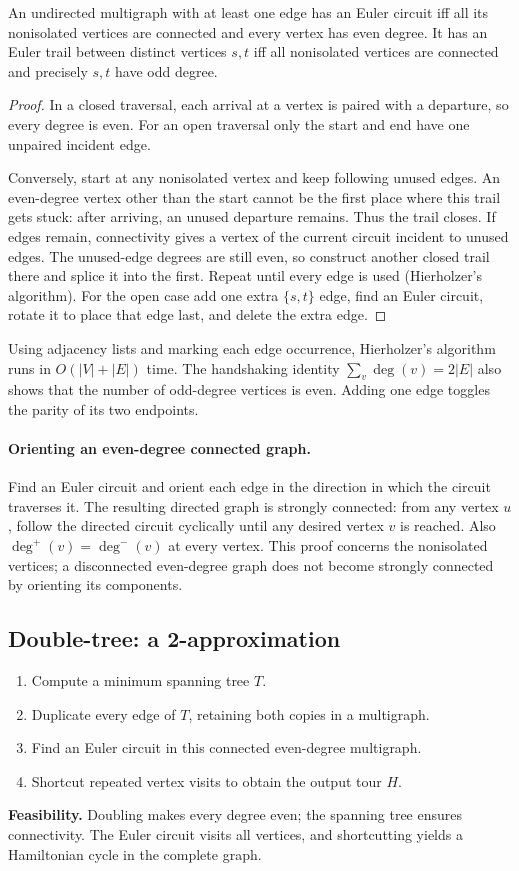 \begin{theorem}
An undirected multigraph with at least one edge has an Euler circuit iff
all its nonisolated vertices are connected and every vertex has even degree.
It has an Euler trail between distinct vertices $s,t$ iff all nonisolated
vertices are connected and precisely $s,t$ have odd degree.
\end{theorem}
\begin{proof}
In a closed traversal, each arrival at a vertex is paired with a departure,
so every degree is even.  For an open traversal only the start and end have
one unpaired incident edge.

Conversely, start at any nonisolated vertex and keep following unused edges.
An even-degree vertex other than the start cannot be the first place where
this trail gets stuck: after arriving, an unused departure remains.  Thus
the trail closes.  If edges remain, connectivity gives a vertex of the
current circuit incident to unused edges.  The unused-edge degrees are
still even, so construct another closed trail there and splice it into the
first.  Repeat until every edge is used (Hierholzer's algorithm).
For the open case add one extra $\{s,t\}$ edge, find an Euler circuit,
rotate it to place that edge last, and delete the extra edge.
\end{proof}
Using adjacency lists and marking each edge occurrence, Hierholzer's
algorithm runs in $O(|V|+|E|)$ time.  The handshaking identity
$\sum_v\deg(v)=2|E|$ also shows that the number of odd-degree vertices is
even.  Adding one edge toggles the parity of its two endpoints.

\paragraph{Orienting an even-degree connected graph.}
Find an Euler circuit and orient each edge in the direction in which the
circuit traverses it.  The resulting directed graph is strongly connected:
from any vertex $u$, follow the directed circuit cyclically until any desired
vertex $v$ is reached.  Also $\deg^+(v)=\deg^-(v)$ at every vertex.
This proof concerns the nonisolated vertices; a disconnected even-degree
graph does not become strongly connected by orienting its components.

\subsection{Double-tree: a 2-approximation}\label{tsp:doubletree}
\begin{enumerate}
  \item Compute a minimum spanning tree $T$.
  \item Duplicate every edge of $T$, retaining both copies in a multigraph.
  \item Find an Euler circuit in this connected even-degree multigraph.
  \item Shortcut repeated vertex visits to obtain the output tour $H$.
\end{enumerate}
\textbf{Feasibility.} Doubling makes every degree even; the spanning tree
ensures connectivity.  The Euler circuit visits all vertices, and
shortcutting yields a Hamiltonian cycle in the complete graph.

